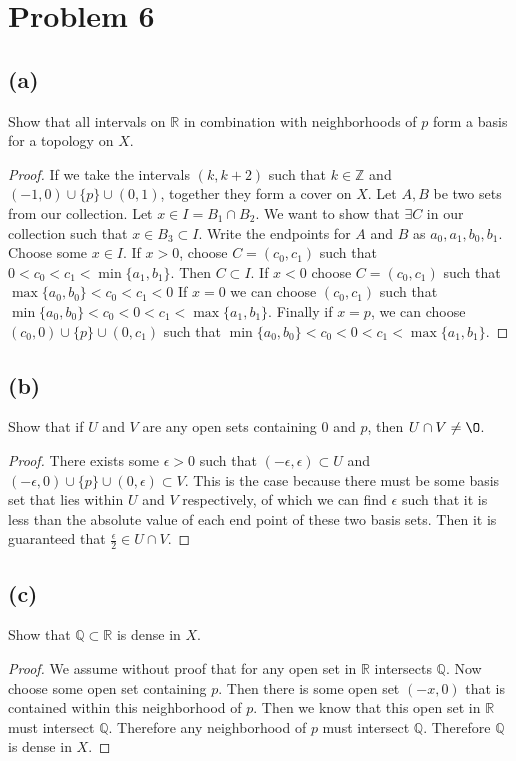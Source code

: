 \documentclass{article}
\theoremstyle{definition}
\begin{document}
\section*{Problem 6}
    \subsection*{(a)} Show that all intervals on $\mathbb{R}$ in combination with neighborhoods of $p$ form a basis for a topology on $X$.
    \begin{proof}
        If we take the intervals $(k, k+2)$ such that $k \in \mathbb{Z}$ and $(-1,0)\cup \{p\} \cup (0,1)$, together they form a cover on $X$.
        Let $A,B$ be two sets from our collection. Let $x \in I = B_1 \cap B_2$. We 
        want to show that $\exists C$ in our collection such that $x \in B_3 \subset I$.
        Write the endpoints for $A$ and $B$ as $a_0, a_1, b_0, b_1$.
        Choose some $x \in I$. If $x > 0$, choose $C = (c_0,c_1)$ such that $0 < c_0 < c_1 < \min\{a_1,b_1\}$.
        Then $C \subset I$. If $x < 0$ choose $C = (c_0, c_1)$ such that $\max\{a_0,b_0\} < c_0 < c_1 < 0$
        If $x = 0$ we can choose $(c_0, c_1)$ such that $\min\{a_0,b_0\} < c_0 < 0 < c_1 < \max\{a_1,b_1\}$.
        Finally if $x = p$, we can choose $(c_0, 0) \cup \{p\} \cup (0,c_1)$ such that $\min\{a_0,b_0\} < c_0 < 0 < c_1 < \max\{a_1,b_1\}$.
    \end{proof}
    \subsection*{(b)}
        Show that if $U$ and $V$ are any open sets containing 0 and $p$, then $U \cap V \neq \O$.
        \begin{proof}
            There exists some $\epsilon > 0$ such that $(-\epsilon,\epsilon) \subset U$ and $(-\epsilon,0) \cup \{p\} \cup (0,\epsilon) \subset V$.
            This is the case because there must be some basis set that lies within $U$ and $V$ respectively, of which we can find $\epsilon$
            such that it is less than the absolute value of each end point of these two basis sets. Then it is guaranteed that $\frac{\epsilon}{2} \in U \cap V$.
        \end{proof}
    \subsection*{(c)}
        Show that $\mathbb{Q} \subset \mathbb{R}$ is dense in $X$.
        \begin{proof}
            We assume without proof that for any open set in $\mathbb{R}$ intersects $\mathbb{Q}$.
            Now choose some open set containing $p$. Then there is some open set $(-x, 0)$ that is contained within this neighborhood of $p$.
            Then we know that this open set in $\mathbb{R}$ must intersect $\mathbb{Q}$. Therefore any 
            neighborhood of $p$ must intersect $\mathbb{Q}$. Therefore $\mathbb{Q}$ is dense in $X$.
        \end{proof}
\end{document}
